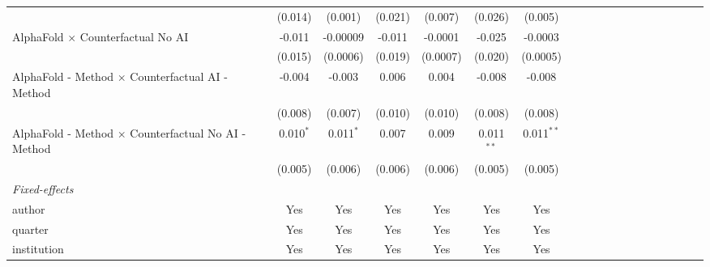 \begin{tabular}{lcccccccccccccccccc}
                                                              & (0.014)     & (0.001)      & (0.021) & (0.007)  & (0.026)       & (0.005)       &       &       &       &       &       &       &       &       &      &      &      &   \\   
   AlphaFold $\times$ Counterfactual No AI                    & -0.011      & -0.00009     & -0.011  & -0.0001  & -0.025        & -0.0003       &       &       &       &       &       &       &       &       &      &      &      &   \\   
                                                              & (0.015)     & (0.0006)     & (0.019) & (0.0007) & (0.020)       & (0.0005)      &       &       &       &       &       &       &       &       &      &      &      &   \\   
   AlphaFold - Method $\times$ Counterfactual AI - Method     & -0.004      & -0.003       & 0.006   & 0.004    & -0.008        & -0.008        &       &       &       &       &       &       &       &       &      &      &      &   \\   
                                                              & (0.008)     & (0.007)      & (0.010) & (0.010)  & (0.008)       & (0.008)       &       &       &       &       &       &       &       &       &      &      &      &   \\   
   AlphaFold - Method $\times$ Counterfactual No AI - Method  & 0.010$^{*}$ & 0.011$^{*}$  & 0.007   & 0.009    & 0.011$^{**}$  & 0.011$^{**}$  &       &       &       &       &       &       &       &       &      &      &      &   \\   
                                                              & (0.005)     & (0.006)      & (0.006) & (0.006)  & (0.005)       & (0.005)       &       &       &       &       &       &       &       &       &      &      &      &   \\   
   \midrule
   \emph{Fixed-effects}\\
   author                                                     & Yes         & Yes          & Yes     & Yes      & Yes           & Yes           &       &       &       &       &       &       &       &       &      &      &      & \\  
   quarter                                                    & Yes         & Yes          & Yes     & Yes      & Yes           & Yes           &       &       &       &       &       &       &       &       &      &      &      & \\  
   institution                                                & Yes         & Yes          & Yes     & Yes      & Yes           & Yes           &       &       &       &       &       &       &       &       &      &      &      & \\  

\end{tabular}

